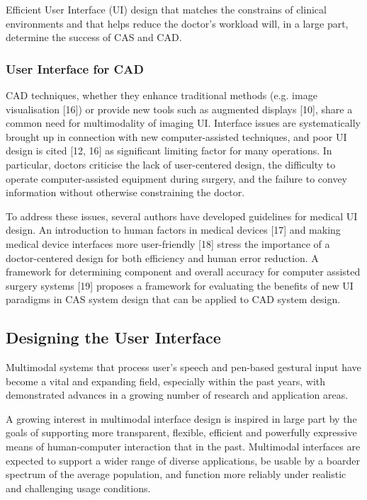 Efficient User Interface (UI) design that matches the constrains of clinical environments and that helps reduce the doctor's workload will, in a large part, determine the success of CAS and CAD.

\subsubsection{User Interface for CAD}

CAD techniques, whether they enhance traditional methods (e.g. image visualisation [16]) or provide new tools such as augmented displays [10], share a common need for multimodality of imaging UI. Interface issues are systematically brought up in connection with new computer-assisted techniques, and poor UI design is cited [12, 16] as significant limiting factor for many operations. In particular, doctors criticise the lack of user-centered design, the difficulty to operate computer-assisted equipment during surgery, and the failure to convey information without otherwise constraining the doctor.

To address these issues, several authors have developed guidelines for medical UI design. An introduction to human factors in medical devices [17] and making medical device interfaces more user-friendly [18] stress the importance of a doctor-centered design for both efficiency and human error reduction. A framework for determining component and overall accuracy for computer assisted surgery systems [19] proposes a framework for evaluating the benefits of new UI paradigms in CAS system design that can be applied to CAD system design.

\clearpage

\subsection{Designing the User Interface}

Multimodal systems that process user's speech and pen-based gestural input have become a vital and expanding field, especially within the past years, with demonstrated advances in a growing number of research and application areas.

A growing interest in multimodal interface design is inspired in large part by the goals of supporting more transparent, flexible, efficient and powerfully expressive means of human-computer interaction that in the past. Multimodal interfaces are expected to support a wider range of diverse applications, be usable by a boarder spectrum of the average population, and function more reliably under realistic and challenging usage conditions.

